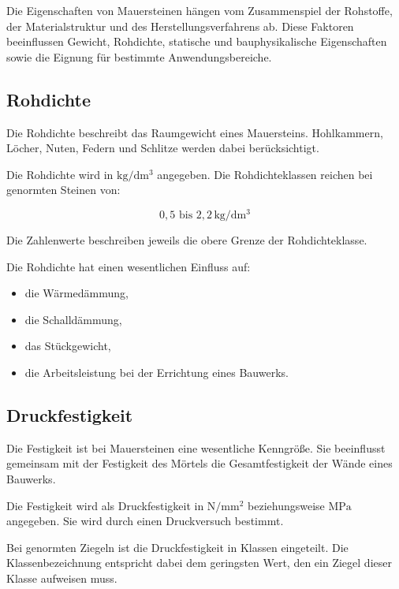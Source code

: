 \documentclass[
  12pt,
  a4paper,
  oneside
]{scrreprt}
\begin{document}
Die Eigenschaften von Mauersteinen hängen vom Zusammenspiel der
Rohstoffe, der Materialstruktur und des Herstellungsverfahrens ab.
Diese Faktoren beeinflussen Gewicht, Rohdichte, statische und
bauphysikalische Eigenschaften sowie die Eignung für bestimmte
Anwendungsbereiche.


\subsection{Rohdichte}

Die Rohdichte beschreibt das Raumgewicht eines Mauersteins.
Hohlkammern, Löcher, Nuten, Federn und Schlitze werden dabei
berücksichtigt.


Die Rohdichte wird in \(\mathrm{kg/dm^3}\) angegeben. Die
Rohdichteklassen reichen bei genormten Steinen von:

\begin{equation}
  0{,}5 \text{ bis } 2{,}2\,\mathrm{kg/dm^3}
\end{equation}

Die Zahlenwerte beschreiben jeweils die obere Grenze der
Rohdichteklasse.


Die Rohdichte hat einen wesentlichen Einfluss auf:

\begin{itemize}
  \item die Wärmedämmung,
  \item die Schalldämmung,
  \item das Stückgewicht,
  \item die Arbeitsleistung bei der Errichtung eines Bauwerks.
\end{itemize}



\subsection{Druckfestigkeit}

Die Festigkeit ist bei Mauersteinen eine wesentliche Kenngröße. Sie
beeinflusst gemeinsam mit der Festigkeit des Mörtels die
Gesamtfestigkeit der Wände eines Bauwerks.


Die Festigkeit wird als Druckfestigkeit in \(\mathrm{N/mm^2}\)
beziehungsweise \(\mathrm{MPa}\) angegeben. Sie wird durch einen
Druckversuch bestimmt.


Bei genormten Ziegeln ist die Druckfestigkeit in Klassen eingeteilt.
Die Klassenbezeichnung entspricht dabei dem geringsten Wert, den ein
Ziegel dieser Klasse aufweisen muss.
\end{document}
